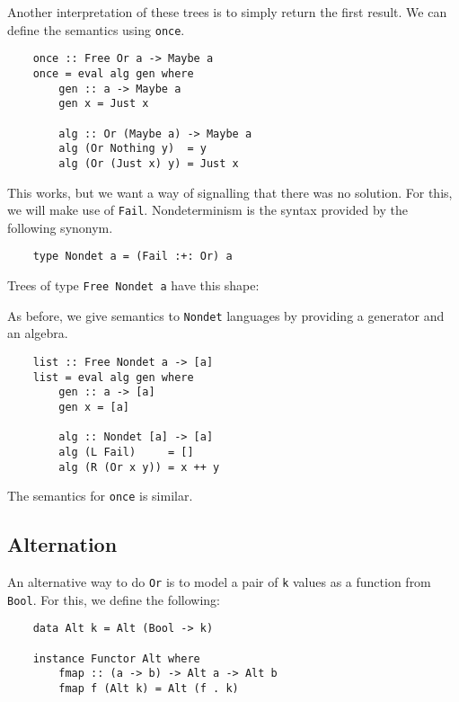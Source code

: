 \documentclass[a4paper,12pt]{article}
\theoremstyle{remark}
\begin{document}
Another interpretation of these trees is to simply return the first result. We can define the semantics
using \lstinline{once}.

\begin{lstlisting}
    once :: Free Or a -> Maybe a
    once = eval alg gen where
        gen :: a -> Maybe a
        gen x = Just x

        alg :: Or (Maybe a) -> Maybe a
        alg (Or Nothing y)  = y
        alg (Or (Just x) y) = Just x  \end{lstlisting}

This works, but we want a way of signalling that there was no solution. For this, we
will make use of \lstinline{Fail}. Nondeterminism is the syntax provided by the following
synonym.

\begin{lstlisting}
    type Nondet a = (Fail :+: Or) a  \end{lstlisting}

Trees of type \lstinline{Free Nondet a} have this shape:

\begin{figure}[H]
  \centering
\end{figure}

As before, we give semantics to \lstinline{Nondet} languages by providing a generator
and an algebra.

\begin{lstlisting}
    list :: Free Nondet a -> [a]
    list = eval alg gen where
        gen :: a -> [a]
        gen x = [a]

        alg :: Nondet [a] -> [a]
        alg (L Fail)     = []
        alg (R (Or x y)) = x ++ y  \end{lstlisting}

The semantics for \lstinline{once} is similar.

\subsection{Alternation}

An alternative way to do \lstinline{Or} is to model a pair of \lstinline{k} values
as a function from \lstinline{Bool}. For this, we define the following:

\begin{lstlisting}
    data Alt k = Alt (Bool -> k)

    instance Functor Alt where
        fmap :: (a -> b) -> Alt a -> Alt b
        fmap f (Alt k) = Alt (f . k)  \end{lstlisting}
\end{document}
